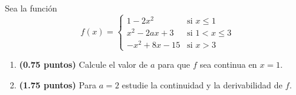 
Sea la función
\[
f(x)=\begin{cases}1-2x^2&\text{si }x\leq1\\[0.4em]x^2-2ax+3&\text{si }1<x\leq3\\[0.4em]-x^2+8x-15&\text{si }x>3\end{cases}
\]
\begin{enumerate}[label=\alph*)]
\item \textbf{(0.75 puntos)} Calcule el valor de $a$ para que $f$ sea continua en $x=1$.
\item \textbf{(1.75 puntos)} Para $a=2$ estudie la continuidad y la derivabilidad de $f$.
\end{enumerate}
